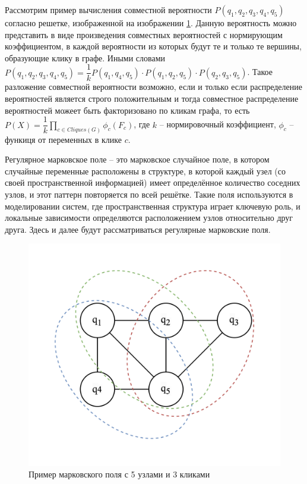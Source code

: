 Рассмотрим пример вычисления совместной вероятности $P(q_1, q_2, q_3, q_4, q_5)$ согласно решетке, изображенной на изображении \ref{fig:markov_field_prob_ex}. Данную вероятность можно представить в виде произведения совместных вероятностей с нормирующим коэффициентом, в каждой вероятности из которых будут те и только те вершины, образующие клику в графе. Иными словами $P(q_1, q_2, q_3, q_4, q_5) = \dfrac{1}{k} P(q_1, q_4, q_5) \cdot P(q_1, q_2, q_5) \cdot P(q_2, q_3, q_5)$. Такое разложение совместной вероятности возможно, если и только если распределение вероятностей является строго положительным и тогда совместное распределение вероятностей можеет быть факторизовано по кликам графа, то есть $P(X) = \dfrac{1}{k} \prod\limits_{c \in Cliques(G)} \phi_c (F_c)$, где $k$ -- нормировочный коэффициент, $\phi_c$ -- функиця от переменных в клике $c$.

Регулярное марковское поле -- это марковское случайное поле, в котором случайные переменные расположены в структуре, в которой каждый узел (со своей пространственной информацией) имеет определённое количество соседних узлов, и этот паттерн повторяется по всей решётке. Такие поля используются в моделировании систем, где пространственная структура играет ключевую роль, и локальные зависимости определяются расположением узлов относительно друг друга. Здесь и далее будут рассматриваться регулярные марковские поля.

\begin{figure}[H]
	\begin{center}
		\includegraphics[width=0.7\linewidth]{src/img/1/markov_field_prob_ex.png}
		\caption{Пример марковского поля с 5 узлами и 3 кликами}
		\label{fig:markov_field_prob_ex}
	\end{center}
\end{figure}

